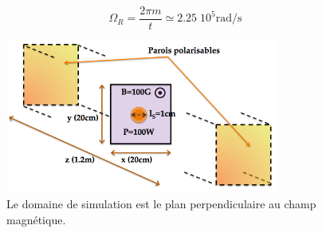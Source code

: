\begin{refsection}
\begin{equation}
\Omega_R=\frac{2\pi m}{t}\simeq2.25\;10^5\text{rad/s}
\end{equation}
\begin{figure}[!htbp]
\centering
\includegraphics[width=0.8\textwidth]{figures/4-cybeleSimDomain.png}
{\caption{Le domaine de simulation est le plan perpendiculaire au champ
magnétique.}
\label{4-cybeleSimDomain}}
\end{figure}
\begin{figure}[!htbp]
  \centering

\end{figure}
\end{refsection}
